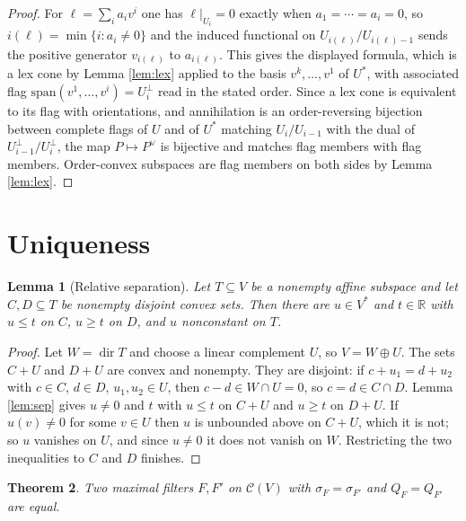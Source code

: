 \documentclass[11pt]{amsart}
\theoremstyle{plain}
\newtheorem{theorem}{Theorem}[section]
\newtheorem{lemma}[theorem]{Lemma}
\theoremstyle{definition}
\DeclareMathOperator{\dir}{dir}
\newcommand{\CC}{\mathscr{C}}
\newcommand{\RR}{\mathbb{R}}
\newcommand{\Vs}{V^{*}}
\begin{document}
\begin{proof}
For $\ell=\sum_ia_iv^i$ one has $\ell|_{U_i}=0$ exactly when $a_1=\cdots=a_i=0$, so $i(\ell)=\min\{i:a_i\neq0\}$ and the induced functional on $U_{i(\ell)}/U_{i(\ell)-1}$ sends the positive generator $v_{i(\ell)}$ to $a_{i(\ell)}$. This gives the displayed formula, which is a lex cone by Lemma \ref{lem:lex} applied to the basis $v^{k},\dots,v^{1}$ of $U^{*}$, with associated flag $\mathrm{span}(v^1,\dots,v^i)=U_i^{\perp}$ read in the stated order. Since a lex cone is equivalent to its flag with orientations, and annihilation is an order-reversing bijection between complete flags of $U$ and of $U^{*}$ matching $U_i/U_{i-1}$ with the dual of $U_{i-1}^{\perp}/U_{i}^{\perp}$, the map $P\mapsto P^{\vee}$ is bijective and matches flag members with flag members. Order-convex subspaces are flag members on both sides by Lemma \ref{lem:lex}.
\end{proof}

\section{Uniqueness}\label{sec:unique}

\begin{lemma}[Relative separation]\label{lem:sep-rel}
Let $T\subseteq V$ be a nonempty affine subspace and let $C,D\subseteq T$ be nonempty disjoint convex sets. Then there are $u\in\Vs$ and $t\in\RR$ with $u\le t$ on $C$, $u\ge t$ on $D$, and $u$ nonconstant on $T$.
\end{lemma}

\begin{proof}
Let $W=\dir T$ and choose a linear complement $U$, so $V=W\oplus U$. The sets $C+U$ and $D+U$ are convex and nonempty. They are disjoint: if $c+u_1=d+u_2$ with $c\in C$, $d\in D$, $u_1,u_2\in U$, then $c-d\in W\cap U=0$, so $c=d\in C\cap D$. Lemma \ref{lem:sep} gives $u\neq0$ and $t$ with $u\le t$ on $C+U$ and $u\ge t$ on $D+U$. If $u(v)\neq0$ for some $v\in U$ then $u$ is unbounded above on $C+U$, which it is not; so $u$ vanishes on $U$, and since $u\neq0$ it does not vanish on $W$. Restricting the two inequalities to $C$ and $D$ finishes.
\end{proof}

\begin{theorem}\label{thm:unique}
Two maximal filters $F,F'$ on $\CC(V)$ with $\sigma_F=\sigma_{F'}$ and $Q_F=Q_{F'}$ are equal.
\end{theorem}
\end{document}
